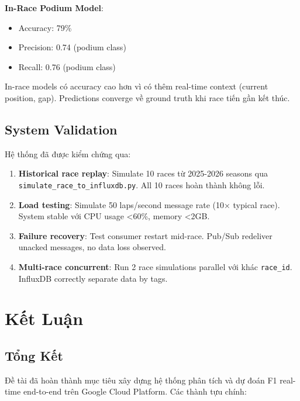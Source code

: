 \documentclass[conference,10pt]{IEEEtran}
\begin{document}
\textbf{In-Race Podium Model}:
\begin{itemize}
    \item Accuracy: 79\%
    \item Precision: 0.74 (podium class)
    \item Recall: 0.76 (podium class)
\end{itemize}

In-race models có accuracy cao hơn vì có thêm real-time context (current position, gap). Predictions converge về ground truth khi race tiến gần kết thúc.

\subsection{System Validation}

Hệ thống đã được kiểm chứng qua:

\begin{enumerate}
    \item \textbf{Historical race replay}: Simulate 10 races từ 2025-2026 seasons qua \texttt{simulate\_race\_to\_influxdb.py}. All 10 races hoàn thành không lỗi.

    \item \textbf{Load testing}: Simulate 50 laps/second message rate (10× typical race). System stable với CPU usage <60\%, memory <2GB.

    \item \textbf{Failure recovery}: Test consumer restart mid-race. Pub/Sub redeliver unacked messages, no data loss observed.

    \item \textbf{Multi-race concurrent}: Run 2 race simulations parallel với khác \texttt{race\_id}. InfluxDB correctly separate data by tags.
\end{enumerate}

\section{Kết Luận}

\subsection{Tổng Kết}

Đề tài đã hoàn thành mục tiêu xây dựng hệ thống phân tích và dự đoán F1 real-time end-to-end trên Google Cloud Platform. Các thành tựu chính:
\end{document}
